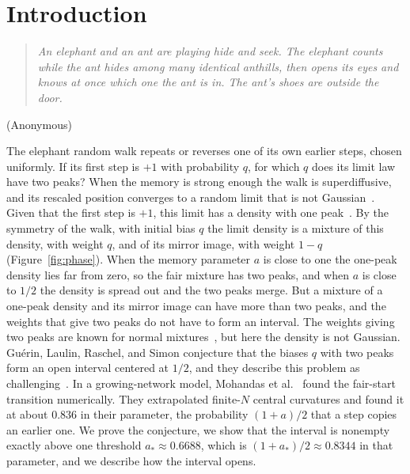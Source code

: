 \section{Introduction}\label{sec:intro}\label{sec:notation}

\noindent\begin{minipage}{\linewidth}
\begin{quote}\small\itshape
An elephant and an ant are playing hide and seek. The elephant counts while
the ant hides among many identical anthills, then opens its eyes and knows
at once which one the ant is in. The ant's shoes are outside the door.
\end{quote}
\hfill\textup{(Anonymous)}
\medskip
\end{minipage}

The elephant random walk repeats or reverses one of its own earlier
steps, chosen uniformly. If its first step is $+1$ with probability
$q$, for which $q$ does its limit law have two peaks? When the memory is
strong enough the walk is superdiffusive, and its rescaled position
converges to a random limit that is not
Gaussian~\cite{dasilva2013}. Given that the first step is $+1$, this
limit has a density with one peak~\cite{glrs2025}. By the symmetry of the walk, with initial bias
$q$ the limit density is a mixture of this density, with weight $q$,
and of its mirror image, with weight $1-q$ (Figure~\ref{fig:phase}).
When the memory parameter $a$ is close to one the one-peak density lies
far from zero, so the fair mixture has two peaks, and when $a$ is close
to $1/2$ the density is spread out and the two peaks merge. But a
mixture of a one-peak density and its mirror image can have more than
two peaks, and the weights that give two peaks do not have to form an
interval. The weights giving two peaks
are known for normal
mixtures~\cite{eisenberger1964,robertsonfryer1969}, but here the
density is not Gaussian. Gu\'erin, Laulin, Raschel, and Simon
conjecture that the biases $q$ with two peaks form an open interval
centered at $1/2$, and they describe this problem as
challenging~\cite[Remark~2.1(b)]{glrs2025}. In a growing-network
model, Mohandas et al.~\cite[Section~V and Figure~5]{mohandas2025}
found the fair-start transition numerically. They extrapolated
finite-$N$ central curvatures and found it at about $0.836$ in their
parameter, the probability $(1+a)/2$ that a step copies an earlier
one. We prove the conjecture, we show that the interval is nonempty
exactly above one threshold $a_*\approx0.6688$, which is
$(1+a_*)/2\approx0.8344$ in that parameter, and we describe how the
interval opens.

